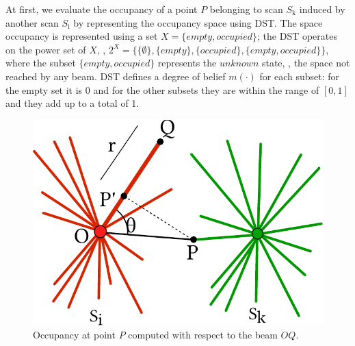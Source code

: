 At first, we evaluate the occupancy of a point $P$ belonging to scan $S_{\text{k}}$ induced by another scan $S_{\text{i}}$ by representing the occupancy space using DST.  The space occupancy is represented using a set $X = \{empty, occupied\}$; the DST operates on the power set of $X$, \ie, $2^X = \{\{\emptyset\}, \{empty\}, \{occupied\}, \{empty,occupied\}\}$, where the subset $\{empty,occupied\}$ represents the $unknown$ state, \ie, the space not reached by any beam. DST defines a degree of belief $m(\cdot)$ for each subset: for the empty set it is 0 and for the other subsets they are within the range of $[0, 1]$ and they add up to a total of 1.

\begin{figure}[t]
\centering
\includegraphics[width=0.99\columnwidth]{./img/ch-laser/scanoccupancy}
\caption{Occupancy at point $P$ computed with respect to the beam $OQ$.}
\label{fig:scanocc}
\end{figure}

